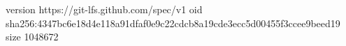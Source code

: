 version https://git-lfs.github.com/spec/v1
oid sha256:4347bc6e18d4e118a91dfaf0e9c22cdcb8a19cde3ecc5d00455f3ccee9beed19
size 1048672
